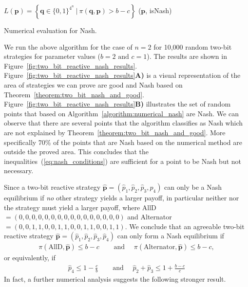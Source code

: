 \documentclass{article}
\theoremstyle{definition}
\begin{document}
\begin{algorithm}[H]
   $L(\mathbf{p}) = \left\{\mathbf{q} \in \{0, 1\}^{4 ^ n} ~\big|~ \pi({\mathbf{q}}, \mathbf{p}) > b\!-\!c \right\}$\;
  \Return (\(\mathbf{p}\), isNash) \;
  \caption{Numerical evaluation for Nash.}\label{algorithm:numerical_nash}
\end{algorithm}

We run the above algorithm for the case of \(n=2\) for 10,000 random two-bit strategies for
parameter values (\(b=2 \text{ and } c=1\)). The results are shown in
Figure~\ref{fig:two_bit_reactive_nash_results}.
Figure~\ref{fig:two_bit_reactive_nash_results}\textbf{A)} is a visual
representation of the area of strategies we can prove are good and Nash based on
Theorem~\ref{theorem:two_bit_nash_and_good}.
Figure~\ref{fig:two_bit_reactive_nash_results}\textbf{B)} illustrates the set of
random points that based on Algorithm~\ref{algorithm:numerical_nash} are Nash.
We can observe that there are several points that the algorithm classifies as
Nash which are not explained by Theorem~\ref{theorem:two_bit_nash_and_good}.
More specifically 70\% of the points that are Nash based on the numerical method
are outside the proved area. This concludes that the
inequalities~(\ref{eq:nash_conditions}) are sufficient for a point to be Nash
but not necessary.

Since a two-bit reactive strategy \(\mathbf{\hat{p}} = (\hat{p}_{1},
\hat{p}_{2}, \hat{p}_{3}, \hat{p}_{4})\) can only be a Nash equilibrium if {\it no} other strategy yields a larger payoff,  in particular neither  nor the  strategy must yield a larger payoff, where
AllD\(=(0, 0, 0, 0, 0, 0, 0, 0, 0, 0, 0, 0, 0, 0, 0, 0)\) and
Alternator\(=(0, 0, 1, 1, 0, 0, 1, 1, 0, 0, 1, 1, 0, 0, 1, 1)\). 
We conclude that an agreeable two-bit reactive strategy  \(\mathbf{\hat{p}} = (\hat{p}_{1}, \hat{p}_{2}, \hat{p}_{3}, \hat{p}_{4})\) can only form a Nash equilibrium if 
\begin{align*}
\pi(\text{AllD}, \mathbf{\hat{p}}) \leq b\!-\!c & \quad \text{ and } \quad \pi(\text{Alternator}, \mathbf{\hat{p}}) \leq b\!-\!c,
\end{align*}
or equivalently, if
\begin{align}\label{Eq:NashConditionDonationGame}
  \hat{p}_4 \leq 1 - \frac{c}{b} & \quad \text{ and } \quad  \hat{p}_2 + \hat{p}_3 \leq 1 + \frac{b\!-\!c}{c}
\end{align}
In fact, a further numerical analysis suggests the following stronger result. 
\end{document}
